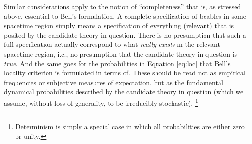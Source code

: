 \documentclass[aps,prc,twocolumn]{revtex4}
\begin{document}
Similar considerations apply to the notion of ``completeness'' that
is, as stressed above, essential to Bell's
formulation.   A  complete specification of
beables in some spacetime region simply means a specification of
everything (relevant) that is posited by the candidate theory in
question.  There is no presumption that such a full specification
actually correspond to what \emph{really exists} in the relevant
spacetime region, i.e., no presumption that the candidate theory in
question is \emph{true}.
And the same goes for the probabilities in Equation
\ref{eq:loc} that Bell's locality criterion is formulated in terms
of.  These should be read not as empirical frequencies or subjective
measures of expectation, but as the fundamental dynamical
probabilities described by the candidate theory in question (which we
assume, without loss of generality, to be irreducibly stochastic).
\footnote{Determinism is simply a special case in which all
  probabilities are either zero or unity.}
\end{document}
